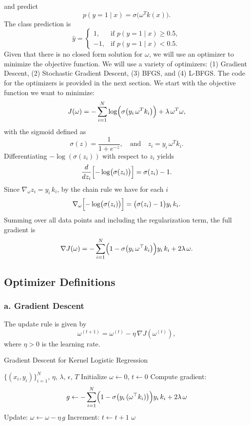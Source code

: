 \documentclass{article}
\begin{document}
and predict
\begin{equation}
    p(y=1\mid x) = \sigma\bigl(\omega^T k(x)\bigr).
\end{equation}
The class prediction is
\begin{equation}
  \hat{y} = \begin{cases}
    1, & \text{if } p(y=1\mid x) \geq 0.5, \\
    -1, & \text{if } p(y=1\mid x) < 0.5.
  \end{cases}
\end{equation}
Given that there is no closed form solution for \(\omega\), we will use an optimizer to minimize the objective function. We will use a variety of optimizers: (1) Gradient Descent, (2) Stochastic Gradient Descent, (3) BFGS, and (4) L-BFGS. The code for the optimizers is provided in the next section. We start with the objective function we want to minimize:
\[
J(\omega) = -\sum_{i=1}^{N} \log\Bigl(\sigma\bigl(y_i\,\omega^T k_i\bigr)\Bigr) + \lambda\,\omega^T\omega,
\]
with the sigmoid defined as
\[
\sigma(z)=\frac{1}{1+e^{-z}}, \quad \text{and} \quad z_i = y_i\,\omega^T k_i.
\]
Differentiating \(-\log(\sigma(z_i))\) with respect to \(z_i\) yields
\[
\frac{d}{dz_i}\Bigl[-\log\bigl(\sigma(z_i)\bigr)\Bigr] = \sigma(z_i)-1.
\]
Since \(\nabla_\omega z_i = y_i\,k_i\), by the chain rule we have for each \(i\)
\[
\nabla_\omega\Bigl[-\log\bigl(\sigma(z_i)\bigr)\Bigr] = \bigl(\sigma(z_i)-1\bigr)y_i\,k_i.
\]
Summing over all data points and including the regularization term, the full gradient is
\begin{equation}
  \nabla J(\omega) = -\sum_{i=1}^{N} \Bigl(1 - \sigma\bigl(y_i\,\omega^\top k_i\bigr)\Bigr)y_i\,k_i + 2\lambda\,\omega.
\end{equation}

\subsection{Optimizer Definitions}
\subsubsection{a. Gradient Descent}

The update rule is given by
\[
\omega^{(t+1)} = \omega^{(t)} - \eta\, \nabla J(\omega^{(t)}),
\]
where \(\eta > 0\) is the learning rate.

\begin{algorithm}
  \caption{Gradient Descent for Kernel Logistic Regression}
  \begin{algorithmic}[1]
  \Require $\{(x_i, y_i)\}_{i=1}^{N}$, $\eta$, $\lambda$, $\epsilon$, $T$
  \State Initialize $\omega \gets 0$, $t \gets 0$
  \Repeat
      \State Compute gradient:
      \[
        g \gets -\sum_{i=1}^{N}\Bigl(1-\sigma\bigl(y_i\,(\omega^\top k_i)\bigr)\Bigr)y_i\,k_i + 2\lambda\,\omega
      \]
      \State Update: $\omega \gets \omega - \eta\, g$
      \State Increment: $t \gets t+1$
  \State \Return $\omega$
  \end{algorithmic}
\end{algorithm}
\end{document}
